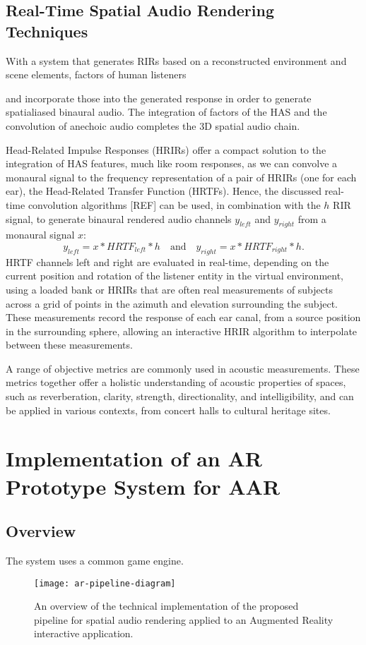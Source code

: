 \subsection{Real-Time Spatial Audio Rendering Techniques}

With a system that generates RIRs based on a reconstructed environment and scene elements, factors of human listeners

and incorporate those into the generated response in order to generate spatialiased binaural audio. The integration of factors of the HAS and the convolution of anechoic audio completes the 3D spatial audio chain.\par
Head-Related Impulse Responses (HRIRs) offer a compact solution to the integration of HAS features, much like room responses, as we can convolve a monaural signal to the frequency representation of a pair of HRIRs (one for each ear), the Head-Related Transfer Function (HRTFs). Hence, the discussed real-time convolution algorithms [REF] can be used, in combination with the $h$ RIR signal, to generate binaural rendered audio channels $y_{left}$ and $y_{right}$ from a monaural signal $x$:
\begin{equation}
    y_{left} = x * HRTF_{left} * h \quad \textrm{and} \quad  y_{right} = x * HRTF_{right} * h \textrm{.}
\end{equation}
HRTF channels left and right are evaluated in real-time, depending on the current position and rotation of the listener entity in the virtual environment, using a loaded bank or HRIRs that are often real measurements of subjects across a grid of points in the azimuth and elevation surrounding the subject. These measurements record the response of each ear canal, from a source position in the surrounding sphere, allowing an interactive HRIR algorithm to interpolate between these measurements.

A range of objective metrics are commonly used in acoustic measurements. These metrics together offer a holistic understanding of acoustic properties of spaces, such as reverberation, clarity, strength, directionality, and intelligibility, and can be applied in various contexts, from concert halls to cultural heritage sites. 


\section{Implementation of an AR Prototype System for AAR}

\subsection{Overview}
The system uses a common game engine.
\begin{figure}[htb]
    \centering
    \texttt{[image: ar-pipeline-diagram]}
    \caption{An overview of the technical implementation of the proposed pipeline for spatial audio rendering applied to an Augmented Reality interactive application. }
    \label{fig:ar-pipeline-overview}
\end{figure}

